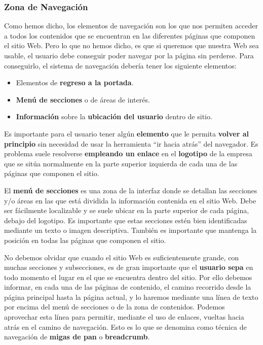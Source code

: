 \subsubsection{Zona de Navegación}
Como hemos dicho, los elementos de navegación son los que nos permiten acceder a todos los contenidos que se encuentran en las diferentes páginas que componen el sitio Web. Pero lo que no hemos dicho, es que si queremos que nuestra Web sea usable, el usuario debe conseguir poder navegar por la página sin perderse. Para conseguirlo, el sistema de navegación debería tener los siguiente elementos:

\begin{itemize}
    \item Elementos de \textbf{regreso a la portada}.
    \item \textbf{Menú de secciones} o de áreas de interés.
    \item \textbf{Información} sobre la \textbf{ubicación del usuario} dentro de sitio.
\end{itemize}

Es importante para el usuario tener algún \textbf{elemento} que le permita \textbf{volver al principio} sin necesidad de usar la herramienta ``ir hacia atrás'' del navegador. Es problema suele resolverse \textbf{empleando un enlace} en el \textbf{logotipo} de la empresa que se sitúa normalmente en la parte superior izquierda de cada una de las páginas que componen el sitio.

El \textbf{menú de secciones} es una zona de la interfaz donde se detallan las secciones y/o áreas en las que está dividida la información contenida en el sitio Web. Debe ser fácilmente localizable y se suele ubicar en la parte superior de cada página, debajo del logotipo. Es importante que estas secciones estén bien identificadas mediante un texto o imagen descriptiva. También es importante que mantenga la posición en todas las páginas que componen el sitio.

No debemos olvidar que cuando el sitio Web es suficientemente grande, con muchas secciones y subsecciones, es de gran importante que el \textbf{usuario sepa} en todo momento el lugar en el que se encuentra dentro del sitio. Por ello debemos informar, en cada una de las páginas de contenido, el camino recorrido desde la página principal hasta la página actual, y lo haremos mediante una línea de texto por encima del menú de secciones o de la zona de contenidos. Podemos aprovechar esta línea para permitir, mediante el uso de enlaces, vueltas hacia atrás en el camino de navegación. Esto es lo que se denomina como técnica de navegación de \textbf{migas de pan} o \textbf{breadcrumb}.

